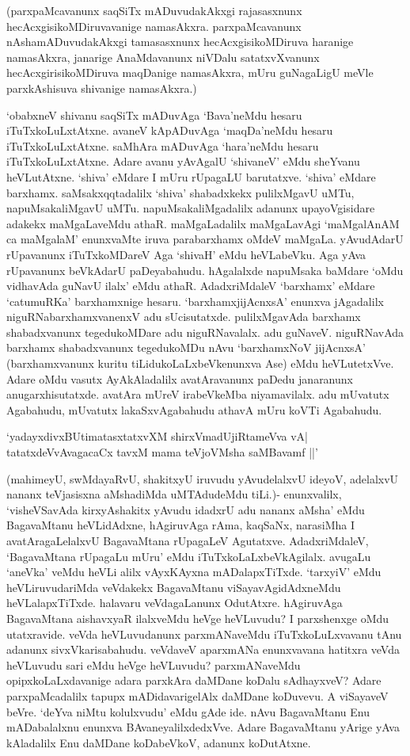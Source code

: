 (parxpaMcavanunx saqSiTx mADuvudakAkxgi rajasasxnunx hecAcxgisikoMDiruvavanige namasAkxra. parxpaMcavanunx nAshamADuvudakAkxgi tamasasxnunx hecAcxgisikoMDiruva haranige namasAkxra, janarige AnaMdavanunx niVDalu satatxvXvanunx hecAcxgirisikoMDiruva maqDanige namasAkxra, mUru guNagaLigU meVle parxkAshisuva shivanige namasAkxra.)


`obabxneV shivanu saqSiTx mADuvAga `Bava'neMdu hesaru iTuTxkoLuLxtAtxne. avaneV kApADuvAga `maqDa'neMdu hesaru iTuTxkoLuLxtAtxne. saMhAra mADuvAga `hara'neMdu hesaru iTuTxkoLuLxtAtxne. Adare avanu yAvAgalU `shivaneV' eMdu sheYvanu heVLutAtxne. `shiva' eMdare I mUru rUpagaLU barutatxve. `shiva' eMdare barxhamx. saMsakxqqtadalilx `shiva' shabadxkekx pulilxMgavU uMTu, napuMsakaliMgavU uMTu. napuMsakaliMgadalilx adanunx upayoVgisidare adakekx maMgaLaveMdu athaR. maMgaLadalilx maMgaLavAgi `maMgalAnAM ca maMgalaM' enunxvaMte iruva parabarxhamx oMdeV maMgaLa. yAvudAdarU rUpavanunx iTuTxkoMDareV Aga `shivaH' eMdu heVLabeVku. Aga yAva rUpavanunx beVkAdarU paDeyabahudu. hAgalalxde napuMsaka baMdare `oMdu vidhavAda guNavU ilalx' eMdu athaR. AdadxriMdaleV `barxhamx' eMdare `catumuRKa' barxhamxnige hesaru. `barxhamxjijAcnxsA' enunxva jAgadalilx niguRNabarxhamxvanenxV adu sUcisutatxde. pulilxMgavAda barxhamx shabadxvanunx tegedukoMDare adu niguRNavalalx. adu guNaveV. niguRNavAda barxhamx shabadxvanunx tegedukoMDu nAvu `barxhamxNoV jijAcnxsA' (barxhamxvanunx kuritu tiLidukoLaLxbeVkenunxva Ase) eMdu heVLutetxVve. Adare oMdu vasutx AyAkAladalilx avatAravanunx paDedu janaranunx anugarxhisutatxde. avatAra mUreV irabeVkeMba niyamavilalx. adu mUvatutx Agabahudu, mUvatutx lakaSxvAgabahudu athavA mUru koVTi Agabahudu.

\begin{shloka}
`yadayxdivxBUtimatasxtatxvXM shirxVmadUjiRtameVva vA|\\
tatatxdeVvAvagacaCx tavxM mama teVjoVMsha saMBavamf ||'
\end{shloka}

(mahimeyU, swMdayaRvU, shakitxyU iruvudu yAvudelalxvU ideyoV, adelalxvU nananx teVjasisxna aMshadiMda uMTAdudeMdu tiLi.)- enunxvalilx, 
`visheVSavAda kirxyAshakitx yAvudu idadxrU adu nananx aMsha' eMdu BagavaMtanu heVLidAdxne, hAgiruvAga rAma, kaqSaNx, narasiMha I avatAragaLelalxvU BagavaMtana rUpagaLeV Agutatxve. AdadxriMdaleV, `BagavaMtana rUpagaLu mUru' eMdu iTuTxkoLaLxbeVkAgilalx. avugaLu `aneVka' veMdu heVLi alilx vAyxKAyxna mADalapxTiTxde. `tarxyiV' eMdu heVLiruvudariMda veVdakekx BagavaMtanu viSayavAgidAdxneMdu heVLalapxTiTxde. halavaru veVdagaLanunx OdutAtxre. hAgiruvAga BagavaMtana aishavxyaR ilalxveMdu heVge heVLuvudu? I parxshenxge oMdu utatxravide. veVda heVLuvudanunx parxmANaveMdu iTuTxkoLuLxvavanu tAnu adanunx sivxVkarisabahudu. veVdaveV aparxmANa enunxvavana hatitxra veVda heVLuvudu sari eMdu heVge heVLuvudu? parxmANaveMdu opipxkoLaLxdavanige adara parxkAra daMDane koDalu sAdhayxveV? Adare parxpaMcadalilx tapupx mADidavarigelAlx daMDane koDuvevu. A viSayaveV beVre. `deYva niMtu kolulxvudu' eMdu gAde ide. nAvu BagavaMtanu Enu mADabalalxnu enunxva BAvaneyalilxdedxVve. Adare BagavaMtanu yArige yAva kAladalilx Enu daMDane koDabeVkoV, adanunx koDutAtxne.

